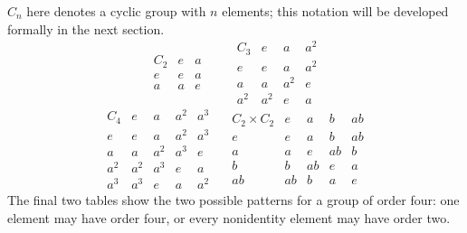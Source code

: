 \begin{example}
\(C_n\) here denotes a cyclic group with \(n\) elements; this notation will be
developed formally in the next section.
\[
\begin{array}{c|cc}C_2&e&a\\\hline e&e&a\\a&a&e\end{array}\qquad
\begin{array}{c|ccc}C_3&e&a&a^2\\\hline e&e&a&a^2\\a&a&a^2&e\\a^2&a^2&e&a\end{array}
\]
\[
\begin{array}{c|cccc}C_4&e&a&a^2&a^3\\\hline
e&e&a&a^2&a^3\\a&a&a^2&a^3&e\\a^2&a^2&a^3&e&a\\a^3&a^3&e&a&a^2\end{array}
\quad
\begin{array}{c|cccc}C_2\times C_2&e&a&b&ab\\\hline
e&e&a&b&ab\\a&a&e&ab&b\\b&b&ab&e&a\\ab&ab&b&a&e\end{array}
\]
The final two tables show the two possible patterns for a group of order
four: one element may have order four, or every nonidentity element may have
order two.
\end{example}

